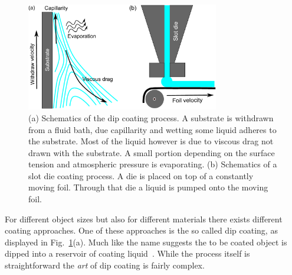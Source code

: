 \begin{figure}
    \centering
    \includegraphics[width=0.75\textwidth]{graphics/Coating_intro.pdf}
    \caption{(a) Schematics of the dip coating process. 
    A substrate is withdrawn from a fluid bath, due capillarity and wetting some liquid adheres to the substrate.
    Most of the liquid however is due to viscous drag not drawn with the substrate.
    A small portion depending on the surface tension and atmospheric pressure is evaporating.
    (b) Schematics of a slot die coating process.
    A die is placed on top of a constantly moving foil.
    Through that die a liquid is pumped onto the moving foil.}
    \label{fig:dip_coating}
\end{figure}
For different object sizes but also for different materials there exists different coating approaches.
One of these approaches is the so called dip coating, as displayed in Fig.~\ref{fig:dip_coating}(a). 
Much like the name suggests the to be coated object is dipped into a reservoir of coating liquid~\cite{scriven_1988, darhuber2000selective, grosso2011exploit}.
While the process itself is straightforward the \textit{art} of dip coating is fairly complex.

